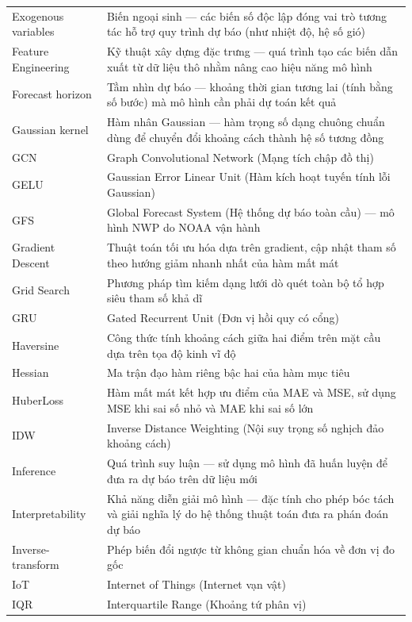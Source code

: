 \begin{longtable}{p{4.2cm} p{10.3cm}}
    Exogenous variables & Biến ngoại sinh --- các biến số độc lập đóng vai trò tương tác hỗ trợ quy trình dự báo (như nhiệt độ, hệ số gió) \\
    Feature Engineering & Kỹ thuật xây dựng đặc trưng --- quá trình tạo các biến dẫn xuất từ dữ liệu thô nhằm nâng cao hiệu năng mô hình \\
    Forecast horizon & Tầm nhìn dự báo --- khoảng thời gian tương lai (tính bằng số bước) mà mô hình cần phải dự toán kết quả \\
    Gaussian kernel & Hàm nhân Gaussian --- hàm trọng số dạng chuông chuẩn dùng để chuyển đổi khoảng cách thành hệ số tương đồng \\
    GCN & Graph Convolutional Network (Mạng tích chập đồ thị) \\
    GELU & Gaussian Error Linear Unit (Hàm kích hoạt tuyến tính lỗi Gaussian) \\
    GFS & Global Forecast System (Hệ thống dự báo toàn cầu) --- mô hình NWP do NOAA vận hành \\
    Gradient Descent & Thuật toán tối ưu hóa dựa trên gradient, cập nhật tham số theo hướng giảm nhanh nhất của hàm mất mát \\
    Grid Search & Phương pháp tìm kiếm dạng lưới dò quét toàn bộ tổ hợp siêu tham số khả dĩ \\
    GRU & Gated Recurrent Unit (Đơn vị hồi quy có cổng) \\
    Haversine & Công thức tính khoảng cách giữa hai điểm trên mặt cầu dựa trên tọa độ kinh vĩ độ \\
    Hessian & Ma trận đạo hàm riêng bậc hai của hàm mục tiêu \\
    HuberLoss & Hàm mất mát kết hợp ưu điểm của MAE và MSE, sử dụng MSE khi sai số nhỏ và MAE khi sai số lớn \\
    IDW & Inverse Distance Weighting (Nội suy trọng số nghịch đảo khoảng cách) \\
    Inference & Quá trình suy luận --- sử dụng mô hình đã huấn luyện để đưa ra dự báo trên dữ liệu mới \\
    Interpretability & Khả năng diễn giải mô hình --- đặc tính cho phép bóc tách và giải nghĩa lý do hệ thống thuật toán đưa ra phán đoán dự báo \\
    Inverse-transform & Phép biến đổi ngược từ không gian chuẩn hóa về đơn vị đo gốc \\
    IoT & Internet of Things (Internet vạn vật) \\
    IQR & Interquartile Range (Khoảng tứ phân vị) \\

\end{longtable}
